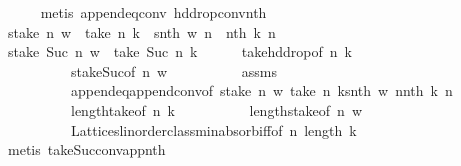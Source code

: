 \begin{isabellebody}
\ \ \ \ \isamarkupfalse%
\ {\isacharparenleft}{\kern0pt}metis\ append{}{\isacharunderscore}{\kern0pt}eq{\isacharunderscore}{\kern0pt}conv\ hd{\isacharunderscore}{\kern0pt}drop{\isacharunderscore}{\kern0pt}conv{\isacharunderscore}{\kern0pt}nth{\isacharparenright}{\kern0pt}\isanewline
{}\isamarkupfalse%
\isanewline
\ \ \isamarkupfalse%
\ {\isachardoublequoteopen}stake\ n\ w\ {\isacharequal}{\kern0pt}\ take\ n\ k\ {\isasymand}\ snth\ w\ n\ {\isacharequal}{\kern0pt}\ nth\ k\ n{\isachardoublequoteclose}\isanewline
\ \ \isamarkupfalse%
\ \isamarkupfalse%
\ {\isachardoublequoteopen}stake\ {\isacharparenleft}{\kern0pt}Suc\ n{\isacharparenright}{\kern0pt}\ w\ {\isacharequal}{\kern0pt}\ take\ {\isacharparenleft}{\kern0pt}Suc\ n{\isacharparenright}{\kern0pt}\ k{\isachardoublequoteclose}\isanewline
\ \ \ \ \isamarkupfalse%
\ take{\isacharunderscore}{\kern0pt}hd{\isacharunderscore}{\kern0pt}drop{\isacharbrackleft}{\kern0pt}of\ n\ k{\isacharbrackright}{\kern0pt}\isanewline
\ \ \ \ \ \ \ \ \ \ stake{\isacharunderscore}{\kern0pt}Suc{\isacharbrackleft}{\kern0pt}of\ n\ w{\isacharbrackright}{\kern0pt}\isanewline
\ \ \ \ \ \ \ \ \ \ assms\isanewline
\ \ \ \ \ \ \ \ \ \ append{\isacharunderscore}{\kern0pt}eq{\isacharunderscore}{\kern0pt}append{\isacharunderscore}{\kern0pt}conv{\isacharbrackleft}{\kern0pt}of\ {\isachardoublequoteopen}stake\ n\ w{\isachardoublequoteclose}\ {\isachardoublequoteopen}take\ n\ k{\isachardoublequoteclose}{\isachardoublequoteopen}{\isacharbrackleft}{\kern0pt}snth\ w\ n{\isacharbrackright}{\kern0pt}{\isachardoublequoteclose}{\isachardoublequoteopen}{\isacharbrackleft}{\kern0pt}nth\ k\ n{\isacharbrackright}{\kern0pt}{\isachardoublequoteclose}\ {\isacharbrackright}{\kern0pt}\isanewline
\ \ \ \ \ \ \ \ \ \ length{\isacharunderscore}{\kern0pt}take{\isacharbrackleft}{\kern0pt}of\ n\ k{\isacharbrackright}{\kern0pt}\isanewline
\ \ \ \ \ \ \ \ \ \ length{\isacharunderscore}{\kern0pt}stake{\isacharbrackleft}{\kern0pt}of\ n\ w{\isacharbrackright}{\kern0pt}\isanewline
\ \ \ \ \ \ \ \ \ \ Lattices{\isachardot}{\kern0pt}linorder{\isacharunderscore}{\kern0pt}class{\isachardot}{\kern0pt}min{\isachardot}{\kern0pt}absorb{\isacharunderscore}{\kern0pt}iff{}{\isacharbrackleft}{\kern0pt}of\ n\ {\isachardoublequoteopen}length\ k{\isachardoublequoteclose}{\isacharbrackright}{\kern0pt}\isanewline
\ \ \ \ \isamarkupfalse%
\ {\isacharparenleft}{\kern0pt}metis\ take{\isacharunderscore}{\kern0pt}Suc{\isacharunderscore}{\kern0pt}conv{\isacharunderscore}{\kern0pt}app{\isacharunderscore}{\kern0pt}nth{\isacharparenright}{\kern0pt}\isanewline

\end{isabellebody}
